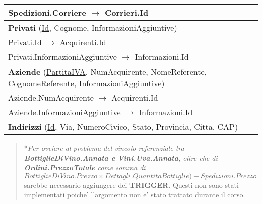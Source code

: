 \begin{center}
\begin{minipage}[t]{7.5cm}
{\begin{tabular}{P{7.5cm}}
				\midrule
				Spedizioni.Corriere $\to$ Corrieri.Id                                                                                                                  \\                                
				\midrule
				 \textbf{Privati} (\underline{Id}, Cognome, InformazioniAggiuntive)                                                    \\
				\midrule
				Privati.Id $\to$ Acquirenti.Id                                                                                                                         \\
				\midrule
				Privati.InformazioniAggiuntive $\to$ Informazioni.Id                                                                                                   \\                                                        
				\midrule
				 \textbf{Aziende} (\underline{PartitaIVA}, NumAcquirente, NomeReferente, CognomeReferente, InformazioniAggiuntive) \\
				\midrule
				Aziende.NumAcquirente $\to$ Acquirenti.Id                                                                                                              \\
				\midrule
				Aziende.InformazioniAggiuntive $\to$ Informazioni.Id                                                                                                   \\                                
				\midrule
				 \textbf{Indirizzi} (\underline{Id}, Via, NumeroCivico, Stato, Provincia, Citta, CAP) \\
				
				\midrule
			\end{tabular}
		}
	\end{minipage}
	
	
	\begin{verse}
	*\emph{Per ovviare al problema del vincolo referenziale tra 	\textbf{BottiglieDiVino.Annata e Vini.Uva.Annata}, oltre che di \textbf{Ordini.PrezzoTotale} come somma di $BottiglieDiVino.Prezzo \times Dettagli.QuantitaBottiglie)+ Spedizioni.Prezzo$} sarebbe necessario aggiungere dei \textbf{TRIGGER}. Questi non sono stati implementati poiche' l'argomento non e' stato trattato durante il corso.
\end{verse}

\end{center}
